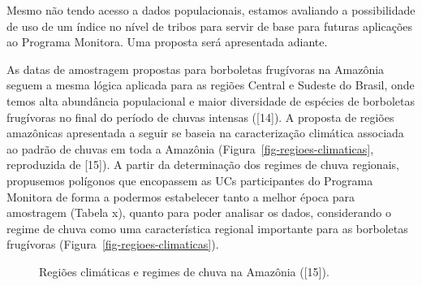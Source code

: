 \documentclass[
  letterpaper,
]{scrbook}
\begin{document}
Mesmo não tendo acesso a dados populacionais, estamos avaliando a
possibilidade de uso de um índice no nível de tribos para servir de base
para futuras aplicações ao Programa Monitora. Uma proposta será
apresentada adiante.

As datas de amostragem propostas para borboletas frugívoras na Amazônia
seguem a mesma lógica aplicada para as regiões Central e Sudeste do
Brasil, onde temos alta abundância populacional e maior diversidade de
espécies de borboletas frugívoras no final do período de chuvas intensas
({[}14{]}). A proposta de regiões amazônicas apresentada a seguir se
baseia na caracterização climática associada ao padrão de chuvas em toda
a Amazônia (Figura~\ref{fig-regioes-climaticas}, reproduzida de
{[}15{]}). A partir da determinação dos regimes de chuva regionais,
propusemos polígonos que encopassem as UCs participantes do Programa
Monitora de forma a podermos estabelecer tanto a melhor época para
amostragem (Tabela x), quanto para poder analisar os dados, considerando
o regime de chuva como uma característica regional importante para as
borboletas frugívoras (Figura~\ref{fig-regioes-climaticas}).

\begin{figure}[H]


\caption{\label{fig-regioes\_climaticas}Regiões climáticas e regimes de
chuva na Amazônia ({[}15{]}).}

\end{figure}%
\end{document}
